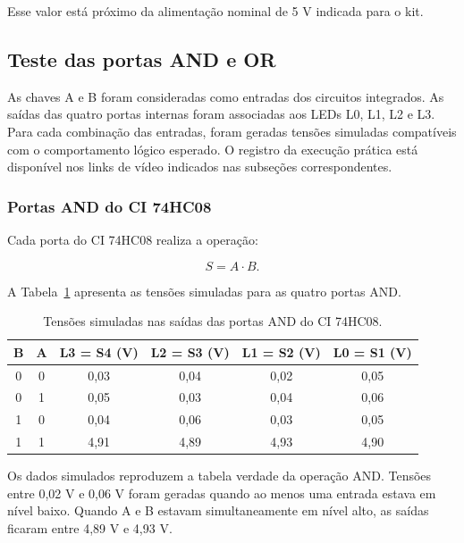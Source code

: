 \documentclass[12pt]{article}
\begin{document}
Esse valor está próximo da alimentação nominal de 5 V indicada para o kit.

\subsection{Teste das portas AND e OR}
\label{sec:portas}

As chaves A e B foram consideradas como entradas dos circuitos integrados. As
saídas das quatro portas internas foram associadas aos LEDs L0, L1, L2 e L3.
Para cada combinação das entradas, foram geradas tensões simuladas compatíveis
com o comportamento lógico esperado. O registro da execução prática está
disponível nos links de vídeo indicados nas subseções correspondentes.

\subsubsection{Portas AND do CI 74HC08}

Cada porta do CI 74HC08 realiza a operação:

\begin{equation}
    S=A\cdot B.
\end{equation}

A Tabela~\ref{tab:and} apresenta as tensões simuladas para as quatro portas AND.

\begin{table}[H]
    \centering
    \caption{Tensões simuladas nas saídas das portas AND do CI 74HC08.}
    \label{tab:and}
    \begin{tabular}{|c|c|c|c|c|c|}
        \hline
        B & A & L3 = S4 (V) & L2 = S3 (V) & L1 = S2 (V) & L0 = S1 (V) \\
        \hline
        0 & 0 & 0,03 & 0,04 & 0,02 & 0,05 \\
        \hline
        0 & 1 & 0,05 & 0,03 & 0,04 & 0,06 \\
        \hline
        1 & 0 & 0,04 & 0,06 & 0,03 & 0,05 \\
        \hline
        1 & 1 & 4,91 & 4,89 & 4,93 & 4,90 \\
        \hline
    \end{tabular}
\end{table}

Os dados simulados reproduzem a tabela verdade da operação AND. Tensões entre
0,02 V e 0,06 V foram geradas quando ao menos uma entrada estava em nível baixo.
Quando A e B estavam simultaneamente em nível alto, as saídas ficaram entre
4,89 V e 4,93 V.
\end{document}
